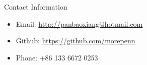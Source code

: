 \documentclass[final]{beamer}
\newlength{\onecolwid}
\begin{document}
\begin{frame}[t]
\begin{columns}[t]
\begin{column}{\onecolwid}

\begin{alertblock}{Contact Information}

\begin{itemize}

\item Email: \href{mailto:john@smith.com}{ http://panbaoxiang@hotmail.com}
\item Github: \href{http://www.university.edu/smithlab}{https://github.com/morepenn}
\item Phone: +86 133 6672 0253
\end{itemize}

\end{alertblock}
 
\end{column} %




\end{columns} %

\end{frame} %
\end{document}
